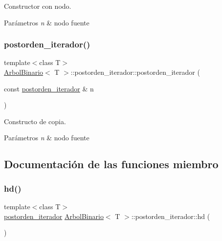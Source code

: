 Constructor con nodo. 


\begin{DoxyParams}{Parámetros}
{\em n} & nodo fuente \\
\hline
\end{DoxyParams}
\mbox{\label{classArbolBinario_1_1postorden__iterador_a083070e5bf8f1f4f5e73e11ae5129a64}} 
\subsubsection{\texorpdfstring{postorden\+\_\+iterador()}{postorden\_iterador()}\hspace{0.1cm}{\footnotesize\ttfamily [3/3]}}
{\footnotesize\ttfamily template$<$class T$>$ \\
\hyperlink{classArbolBinario}{Arbol\+Binario}$<$ T $>$\+::postorden\+\_\+iterador\+::postorden\+\_\+iterador (\begin{DoxyParamCaption}\item[{const \hyperlink{classArbolBinario_1_1postorden__iterador}{postorden\+\_\+iterador} \&}]{n }\end{DoxyParamCaption})\hspace{0.3cm}{\ttfamily [inline]}}



Constructo de copia. 


\begin{DoxyParams}{Parámetros}
{\em n} & nodo fuente \\
\hline
\end{DoxyParams}


\subsection{Documentación de las funciones miembro}
\mbox{\label{classArbolBinario_1_1postorden__iterador_a8c22fe0d4114f7e6be801e711a4b21e8}} 
\subsubsection{\texorpdfstring{hd()}{hd()}}
{\footnotesize\ttfamily template$<$class T$>$ \\
\hyperlink{classArbolBinario_1_1postorden__iterador}{postorden\+\_\+iterador} \hyperlink{classArbolBinario}{Arbol\+Binario}$<$ T $>$\+::postorden\+\_\+iterador\+::hd (\begin{DoxyParamCaption}{ }\end{DoxyParamCaption})\hspace{0.3cm}{\ttfamily [inline]}}



